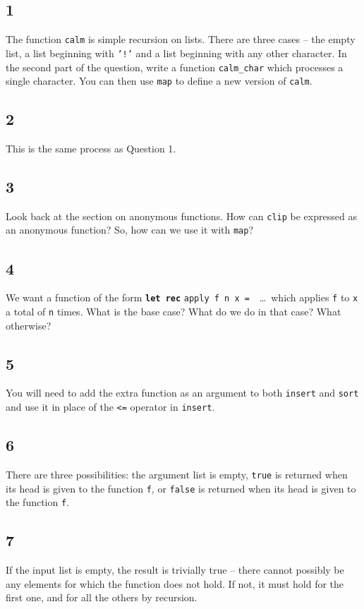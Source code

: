 \documentclass[]{book}
\begin{document}
\subsection*{1}
The function \texttt{calm} is simple recursion on lists. There are three cases -- the empty list, a list beginning with \texttt{'!'} and a list beginning with any other character. In the second part of the question, write a function \texttt{calm\_char} which processes a single character. You can then use \texttt{map} to define a new version of \texttt{calm}.

\subsection*{2}
This is the same process as Question 1.

\subsection*{3}
Look back at the section on anonymous functions. How can \texttt{clip} be expressed as an anonymous function? So, how can we use it with \texttt{map}?

\subsection*{4}
We want a function of the form \textbf{\texttt{let rec}} \texttt{apply f n x =}\ \ \ldots\ which applies \texttt{f} to \texttt{x} a total of \texttt{n} times. What is the base case? What do we do in that case? What otherwise?

\subsection*{5}
You will need to add the extra function as an argument to both \texttt{insert} and \texttt{sort} and use it in place of the \texttt{<=} operator in \texttt{insert}.

\subsection*{6}
There are three possibilities: the argument list is empty, \texttt{true} is returned when its head is given to the function \texttt{f}, or \texttt{false} is returned when its head is given to the function \texttt{f}.

\subsection*{7}
If the input list is empty, the result is trivially true -- there cannot possibly be any elements for which the function does not hold. If not, it must hold for the first one, and for all the others by recursion. 
\end{document}
